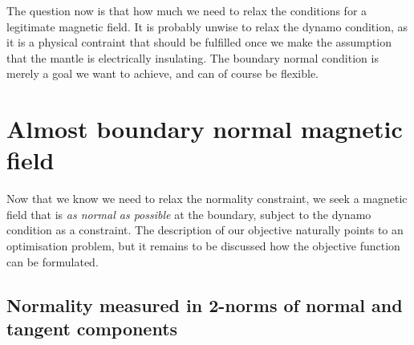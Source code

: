 \documentclass[a4paper, 11pt]{article}
\begin{document}
The question now is that how much we need to relax the conditions for a legitimate magnetic field. It is probably unwise to relax the dynamo condition, as it is a physical contraint that should be fulfilled once we make the assumption that the mantle is electrically insulating. The boundary normal condition is merely a goal we want to achieve, and can of course be flexible.


\section{Almost boundary normal magnetic field}

Now that we know we need to relax the normality constraint, we seek a magnetic field that is \textit{as normal as possible} at the boundary, subject to the dynamo condition as a constraint. The description of our objective naturally points to an optimisation problem, but it remains to be discussed how the objective function can be formulated.

\subsection{Normality measured in 2-norms of normal and tangent components}
\end{document}
